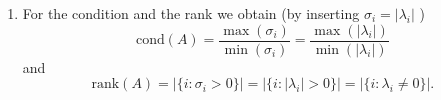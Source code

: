 {\begin{enumerate}
\begin{align*}
{{\begin{pmatrix}
		           &       &|\lambda_r| & &\\
		           &       &            & \ddots&\\
                   0&      &            & &0\\		
		\end{pmatrix}
	}_{\textcolor{blue}{=:\Sigma=\text{diag}(\sigma_1,\ldots,\sigma_r)}}}_{\textcolor{violet}{=V\Lambda}}\underbrace{\begin{pmatrix}-&v_1^\top&-\\ &\vdots& \\-&v_n^\top&-\end{pmatrix}}_{\textcolor{blue}{V^\top}}~~\textcolor{red}{[SVD]}
	\end{align*}
	~\\
	$A$ symmetric and positive definite $\Rightarrow~|\lambda_i|=\lambda_i>0~\Rightarrow~\frac{\lambda_i}{|\lambda_i|}=1$. Thus:\\
	$$\textcolor{blue}{\text{("For spd matrices: SVD = Eigendecomposition!")}}$$
	\item For the condition and the rank we obtain (by inserting $\sigma_i=|\lambda_i|$ )
	$$\text{cond}(A) =  \frac{\max(\sigma_i)}{\min(\sigma_i)} =  \frac{\max(|\lambda_i|)}{\min(|\lambda_i|)}$$
	and
	$$\text{rank}(A) = |\{i: \sigma_i > 0 \}| = |\{i: |\lambda_i| > 0 \}|= |\{i: \lambda_i \neq 0 \}|.$$
\end{enumerate}
}
